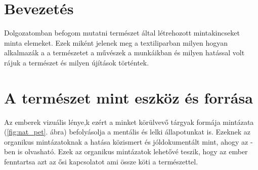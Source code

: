 \documentclass[fontsize=12pt, appendixprefix=true]{scrreprt}
\begin{document}




\tableofcontents


\chapter{Bevezetés}
Dolgozatomban befogom mutatni természet által létrehozott mintakincseket minta elemeket.
Ezek miként jelenek meg a textiliparban milyen hogyan alkalmazák a a természetet a művészek a munkáikban és milyen hatással volt rájuk a természet 
és milyen újítások történtek.


\chapter{A természet mint eszköz és forrása}

Az emberek vizuális lénye,k ezért a minket körülvevő tárgyak formája mintázata (\ref{fig:nat_pet}. ábra) befolyásolja a mentális és lelki állapotunkat is. Ezeknek az organikus mintázatoknak a hatása közismert és jóldokumentált mint, ahogy az \cite{jo2019physiological} -ben is olvasható. Ezek az organikus mintázatok lehetővé teszik, hogy az ember fenntartsa azt az ősi kapcsolatot ami össze köti a természettel. 
\end{document}
